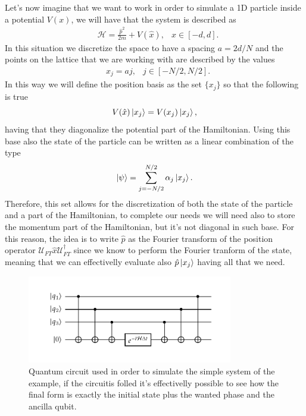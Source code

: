 Let's now imagine that we want to work in order to simulate a 1D particle inside a potential $V(x)$, we will have that the system is described as
\begin{align}
    &\mathcal{H} = \frac{\hat{p}^2}{2m} + V(\hat{x}), &x\in [-d, d].
\end{align}
In this situation we discretize the space to have a spacing $a = 2d/N$ and the points on the lattice that we are working with are described by the values
\begin{align}
    &x_j = aj, &j\in\left[ -N/2, N/2 \right].
\end{align}
In this way we will define the position basis as the set $\{x_j\}$ so that the following is true 
\begin{equation}
    V(\hat{x}) \ket{x_j} = V(x_j) \ket{x_j},
\end{equation}
having that they diagonalize the potential part of the Hamiltonian. Using this base also the state of the particle can be written as a linear combination of the type
\begin{equation}
    \ket{\psi} = \sum_{j = -N/2}^{N/2} \alpha_j \ket{x_j}.
\end{equation}
Therefore, this set allows for the discretization of both the state of the particle and a part of the Hamiltonian, to complete our needs we will need also to store the momentum part of the Hamiltonian, but it's not diagonal in such base. For this reason, the idea is to write $\hat{p}$ as the Fourier transform of the position operator $\mathcal{U}_{FT}\hat{x}\mathcal{U}_{FT}^\dagger$ since we know to perform the Fourier tranform of the state, meaning that we can effectivelly evaluate also $\hat{p}\ket{x_j}$ having all that we need.

\begin{figure}[t]
    \centering
    \includegraphics[width=0.8\textwidth]{Immagini/HSim.pdf}
    \caption{
        Quantum circuit used in order to simulate the simple system of the example, if the circuitis folled it's effectivelly possible to see how the final form is exactly the initial state plus the wanted phase and the ancilla qubit.
    }
    \label{fig:HSim}
\end{figure}

